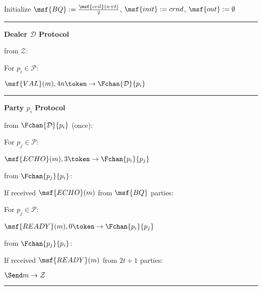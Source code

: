 \begin{bbox}[title={$\Pi_{\msf{Bracha}} (\mathcal{D}, \mathcal{P} = p_1,...,p_n)$ in $\F_{\msf{sync-chan}}$-hybrid}]

Initialize $\msf{BQ} := \frac{\msf{ceil}(n+t)}{2}$, $\msf{init} := crnd$, $\msf{out} := \emptyset$

\vspace{2mm} \hrule \vspace{2mm}

{\bf Dealer $\mathcal{D}$ Protocol}

\OnInput {} from $\mathcal{Z}$:
	\begin{renumerate}
	\item For $p_i \in \mathcal{P}$:

		\quad  \Send $\msf{VAL}(m),4n \token \rightarrow \Fchan{\mathcal{D}}{p_i}$
	\end{renumerate}

\vspace{2mm} \hrule \vspace{2mm}

{\bf Party $p_i$ Protocol}

\OnInput {} from $\Fchan{\mathcal{D}}{p_i}$ (once):
	\begin{renumerate}
	\item For $p_j \in \mathcal{P}$: 
	
	\quad \Send $\msf{ECHO}(m), 3 \token \rightarrow \Fchan{p_i}{p_j}$\\
	\end{renumerate}


\OnInput {} from $\Fchan{p_j}{p_i}$:
	\begin{renumerate}
	\item If received $\msf{ECHO}(m)$ from $\msf{BQ}$ parties:
		\begin{ritemize}
		\item For $p_j \in \mathcal{P}$: 
		
		\quad \Send $\msf{READY}(m), 0 \token \rightarrow \Fchan{p_i}{p_j}$ \\
		\end{ritemize}
	\end{renumerate}

\OnInput {} from $\Fchan{p_j}{p_i}$:
	\begin{renumerate}
	\item If received $\msf{READY}(m)$ from $2t+1$ parties:
		\begin{ritemize}
		\item $\Send m \rightarrow \mathcal{Z}$
		\end{ritemize}
	\end{renumerate}

\vspace{2mm} \hrule \vspace{2mm}

\end{bbox}

